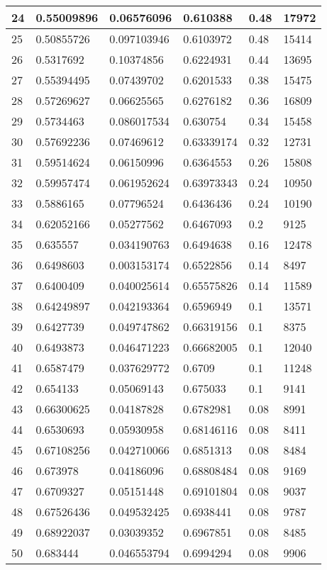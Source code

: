 \begin{longtable}{|l|l|l|l|l|l|}
24 & 0.55009896 & 0.06576096 & 0.610388 & 0.48 & 17972 \\ \hline 
25 & 0.50855726 & 0.097103946 & 0.6103972 & 0.48 & 15414 \\ \hline 
26 & 0.5317692 & 0.10374856 & 0.6224931 & 0.44 & 13695 \\ \hline 
27 & 0.55394495 & 0.07439702 & 0.6201533 & 0.38 & 15475 \\ \hline 
28 & 0.57269627 & 0.06625565 & 0.6276182 & 0.36 & 16809 \\ \hline 
29 & 0.5734463 & 0.086017534 & 0.630754 & 0.34 & 15458 \\ \hline 
30 & 0.57692236 & 0.07469612 & 0.63339174 & 0.32 & 12731 \\ \hline 
31 & 0.59514624 & 0.06150996 & 0.6364553 & 0.26 & 15808 \\ \hline 
32 & 0.59957474 & 0.061952624 & 0.63973343 & 0.24 & 10950 \\ \hline 
33 & 0.5886165 & 0.07796524 & 0.6436436 & 0.24 & 10190 \\ \hline 
34 & 0.62052166 & 0.05277562 & 0.6467093 & 0.2 & 9125 \\ \hline 
35 & 0.635557 & 0.034190763 & 0.6494638 & 0.16 & 12478 \\ \hline 
36 & 0.6498603 & 0.003153174 & 0.6522856 & 0.14 & 8497 \\ \hline 
37 & 0.6400409 & 0.040025614 & 0.65575826 & 0.14 & 11589 \\ \hline 
38 & 0.64249897 & 0.042193364 & 0.6596949 & 0.1 & 13571 \\ \hline 
39 & 0.6427739 & 0.049747862 & 0.66319156 & 0.1 & 8375 \\ \hline 
40 & 0.6493873 & 0.046471223 & 0.66682005 & 0.1 & 12040 \\ \hline 
41 & 0.6587479 & 0.037629772 & 0.6709 & 0.1 & 11248 \\ \hline 
42 & 0.654133 & 0.05069143 & 0.675033 & 0.1 & 9141 \\ \hline 
43 & 0.66300625 & 0.04187828 & 0.6782981 & 0.08 & 8991 \\ \hline 
44 & 0.6530693 & 0.05930958 & 0.68146116 & 0.08 & 8411 \\ \hline 
45 & 0.67108256 & 0.042710066 & 0.6851313 & 0.08 & 8484 \\ \hline 
46 & 0.673978 & 0.04186096 & 0.68808484 & 0.08 & 9169 \\ \hline 
47 & 0.6709327 & 0.05151448 & 0.69101804 & 0.08 & 9037 \\ \hline 
48 & 0.67526436 & 0.049532425 & 0.6938441 & 0.08 & 9787 \\ \hline 
49 & 0.68922037 & 0.03039352 & 0.6967851 & 0.08 & 8485 \\ \hline 
50 & 0.683444 & 0.046553794 & 0.6994294 & 0.08 & 9906 \\ \hline 
\end{longtable}